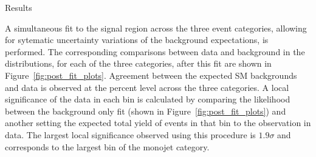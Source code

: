\begin{section}{Results}

A simultaneous fit to the signal region across the three event categories, allowing for sytematic uncertainty variations of the background expectations, is performed.
The corresponding comparisons between data and background in the \ETm distributions, for each of the three categories, after this fit are shown in Figure~\ref{fig:post_fit_plots}.   
Agreement between the expected SM backgrounds and data is observed at the percent level across the three categories. A local significance of the data in each bin is calculated by 
comparing the likelihood between the background only fit (shown in Figure~\ref{fig:post_fit_plots}) and another setting the expected total yield of events in that bin to 
the observation in data. The largest local significance observed using this procedure is $1.9\sigma$ and corresponds to the largest \ETm bin of the monojet category.



\end{section}
